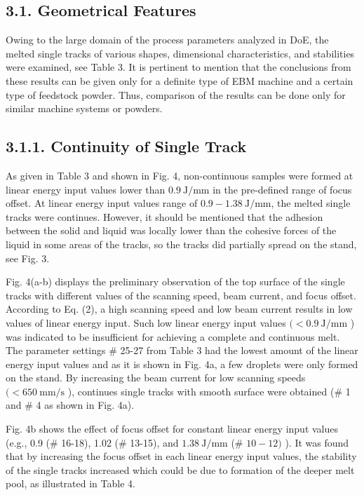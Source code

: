 \documentclass[10pt]{article}
\begin{document}
\subsection*{3.1. Geometrical Features}
Owing to the large domain of the process parameters analyzed in DoE, the melted single tracks of various shapes, dimensional characteristics, and stabilities were examined, see Table 3. It is pertinent to mention that the conclusions from these results can be given only for a definite type of EBM machine and a certain type of feedstock powder. Thus, comparison of the results can be done only for similar machine systems or powders.

\subsection*{3.1.1. Continuity of Single Track}
As given in Table 3 and shown in Fig. 4, non-continuous samples were formed at linear energy input values lower than $0.9 \mathrm{~J} / \mathrm{mm}$ in the pre-defined range of focus offset. At linear energy input values range of $0.9-1.38 \mathrm{~J} / \mathrm{mm}$, the melted single tracks were continues. However, it should be mentioned that the adhesion between the solid and liquid was locally lower than the cohesive forces of the liquid in some areas of the tracks, so the tracks did partially spread on the stand, see Fig. 3.

Fig. 4(a-b) displays the preliminary observation of the top surface of the single tracks with different values of the scanning speed, beam current, and focus offset. According to Eq. (2), a high scanning speed and low beam current results in low values of linear energy input. Such low linear energy input values $(<0.9 \mathrm{~J} / \mathrm{mm}$ ) was indicated to be insufficient for achieving a complete and continuous melt. The parameter settings \# 25-27 from Table 3 had the lowest amount of the linear energy input values and as it is shown in Fig. 4a, a few droplets were only formed on the stand. By increasing the beam current for low scanning speeds $(<650 \mathrm{~mm} / \mathrm{s}$ ), continues single tracks with smooth surface were obtained (\# 1 and \# 4 as shown in Fig. 4a).

Fig. 4b shows the effect of focus offset for constant linear energy input values (e.g., 0.9 (\# 16-18), 1.02 (\# 13-15), and $1.38 \mathrm{~J} / \mathrm{mm}$ (\# $10-12)$ ). It was found that by increasing the focus offset in each linear energy input values, the stability of the single tracks increased which could be due to formation of the deeper melt pool, as illustrated in Table 4.
\end{document}
